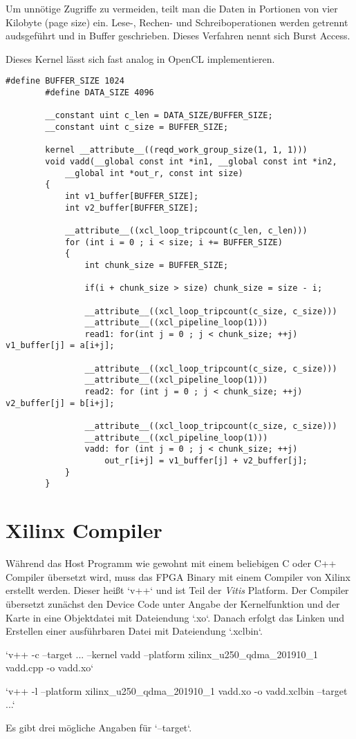 		Um unnötige Zugriffe zu vermeiden, teilt man die Daten in Portionen von vier Kilobyte (page size) ein. Lese-, Rechen- und Schreiboperationen werden getrennt audsgeführt und in Buffer geschrieben. Dieses Verfahren nennt sich Burst Access.
		
		Dieses \Gls{Kernel} lässt sich fast analog in OpenCL implementieren.\\
		\begin{lstlisting}[caption=FPGA: OpenCL Kernel]
		#define BUFFER_SIZE 1024
		#define DATA_SIZE 4096

		__constant uint c_len = DATA_SIZE/BUFFER_SIZE;
		__constant uint c_size = BUFFER_SIZE;

		kernel __attribute__((reqd_work_group_size(1, 1, 1)))
		void vadd(__global const int *in1, __global const int *in2, 
			__global int *out_r, const int size)
		{
			int v1_buffer[BUFFER_SIZE];
			int v2_buffer[BUFFER_SIZE];
    
			__attribute__((xcl_loop_tripcount(c_len, c_len)))
			for (int i = 0 ; i < size; i += BUFFER_SIZE) 
			{
				int chunk_size = BUFFER_SIZE;
        
				if(i + chunk_size > size) chunk_size = size - i;

				__attribute__((xcl_loop_tripcount(c_size, c_size)))
				__attribute__((xcl_pipeline_loop(1)))
				read1: for(int j = 0 ; j < chunk_size; ++j) v1_buffer[j] = a[i+j];

				__attribute__((xcl_loop_tripcount(c_size, c_size)))
				__attribute__((xcl_pipeline_loop(1)))
				read2: for (int j = 0 ; j < chunk_size; ++j) v2_buffer[j] = b[i+j];

				__attribute__((xcl_loop_tripcount(c_size, c_size)))
				__attribute__((xcl_pipeline_loop(1)))
				vadd: for (int j = 0 ; j < chunk_size; ++j) 
					out_r[i+j] = v1_buffer[j] + v2_buffer[j];
			}
		}
		\end{lstlisting}

		\section{Xilinx Compiler}
		Während das Host Programm wie gewohnt mit einem beliebigen C oder C++ Compiler übersetzt wird, muss das FPGA Binary mit einem Compiler von Xilinx erstellt werden. Dieser heißt \li`v++` und ist Teil der \textit{Vitis} Platform. Der Compiler übersetzt zunächst den Device Code unter Angabe der \Gls{Kernel}funktion und der Karte in eine Objektdatei mit Dateiendung \li`.xo`. Danach erfolgt das Linken und Erstellen einer ausführbaren Datei mit Dateiendung \li`.xclbin`.
		\begin{center}
			\li`v++ -c --target ... --kernel vadd --platform xilinx_u250_qdma_201910_1 vadd.cpp -o vadd.xo`
			
			\li`v++ -l --platform xilinx_u250_qdma_201910_1 vadd.xo -o vadd.xclbin --target ...`
		\end{center}
		Es gibt drei mögliche Angaben für \li`--target`. 
		
